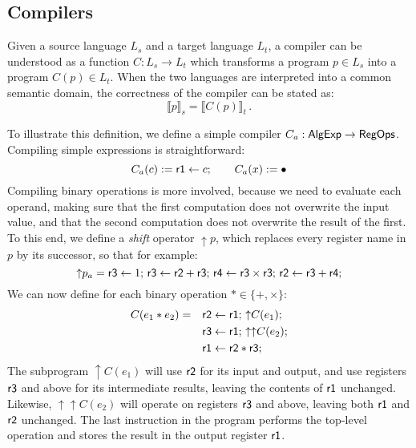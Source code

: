 
\subsection{Compilers} %

Given a source language $L_s$
and a target language $L_t$,
a compiler can be understood as a function
$C : L_s \rightarrow L_t$
which transforms a program $p \in L_s$
into a program $C(p) \in L_t$.
When the two languages are interpreted into
a common semantic domain,
the correctness of the compiler can be stated as:
\[
  \llbracket p \rrbracket_s = \llbracket C(p) \rrbracket_t \,.
\]

{\color{gray} %

\begin{example} %
To illustrate this definition,
we define a simple compiler $C_a :  \mathsf{AlgExp}  \rightarrow  \mathsf{RegOps} $.
Compiling simple expressions is straightforward:
\[
  C_a(c) :=  \mathsf{r1}  \leftarrow c; \qquad
  C_a(x) := \bullet
\]
Compiling binary operations is more involved,
because we need to evaluate each operand,
making sure that the first computation does not overwrite
the input value,
and that the second computation does not overwrite
the result of the first.
To this end,
we define a \emph{shift} operator ${\uparrow} p$,
which replaces every register name in $p$ by its successor,
so that for example:
\[
  {\uparrow} p_a =
   \mathsf{r3}  \leftarrow 1; \,
   \mathsf{r3}  \leftarrow  \mathsf{r2}  +  \mathsf{r3} ; \,
   \mathsf{r4}  \leftarrow  \mathsf{r3}  \times  \mathsf{r3} ; \,
   \mathsf{r2}  \leftarrow  \mathsf{r3}  +  \mathsf{r4} ;
\]
We can now define for each binary operation $* \in \{+, \times\}$:
\begin{align*}
  C(e_1 * e_2) = \quad  %
    &\kw{r2} \leftarrow \kw{r1}; \, %
    {\uparrow} C(e_1); \\
    &\kw{r3} \leftarrow \kw{r1}; \,
    {\uparrow\uparrow} C(e_2); \\
    &\kw{r1} \leftarrow \kw{r2} * \kw{r3};
\end{align*}
The subprogram ${\uparrow} C(e_1)$
will use $ \mathsf{r2} $ for its input and output,
and use registers $ \mathsf{r3} $ and above for its intermediate results,
leaving the contents of $ \mathsf{r1} $ unchanged.
Likewise,
${\uparrow\uparrow} C(e_2)$
will operate on registers $ \mathsf{r3} $ and above,
leaving both $ \mathsf{r1} $ and $ \mathsf{r2} $ unchanged.
The last instruction in the program performs
the top-level operation and stores the result
in the output register $ \mathsf{r1} $.
\end{example}

}
